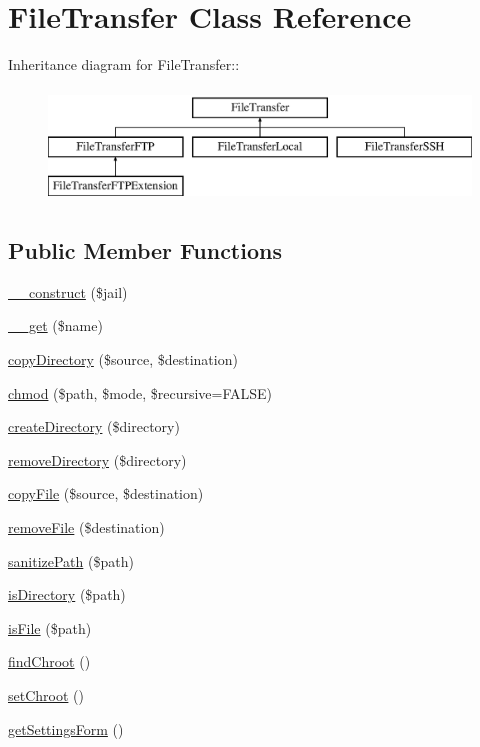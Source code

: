 \hypertarget{classFileTransfer}{
\section{FileTransfer Class Reference}
\label{classFileTransfer}
}
Inheritance diagram for FileTransfer::\begin{figure}[H]
\begin{center}
\leavevmode
\includegraphics[height=3cm]{classFileTransfer}
\end{center}
\end{figure}
\subsection*{Public Member Functions}
\begin{DoxyCompactItemize}
\item 
\hyperlink{classFileTransfer_a179fa76ea4a6f5e3206184cc947a3781}{\_\-\_\-construct} (\$jail)
\item 
\hyperlink{classFileTransfer_a78d103c4fac668da6049bfd4ab713b2f}{\_\-\_\-get} (\$name)
\item 
\hyperlink{classFileTransfer_a85afa98d3b1e04536d298d23bf8c0ceb}{copyDirectory} (\$source, \$destination)
\item 
\hyperlink{classFileTransfer_a7c49554b3cce3ab7cc03e2f45f9934b1}{chmod} (\$path, \$mode, \$recursive=FALSE)
\item 
\hyperlink{classFileTransfer_a8d63f097ba6bf3334420bd8dcccb4898}{createDirectory} (\$directory)
\item 
\hyperlink{classFileTransfer_ace033d9eb68691f41d040cc527b0ea5e}{removeDirectory} (\$directory)
\item 
\hyperlink{classFileTransfer_a8b2a75cd29bb8941663dc51da6a4550c}{copyFile} (\$source, \$destination)
\item 
\hyperlink{classFileTransfer_a3e9fa3033b038b42c8f190da9d6915ab}{removeFile} (\$destination)
\item 
\hyperlink{classFileTransfer_a66b62fbb6a66ffd8f9a986e85aefc98d}{sanitizePath} (\$path)
\item 
\hyperlink{classFileTransfer_a86c4289cfeccacf9bd2bcae8961889ab}{isDirectory} (\$path)
\item 
\hyperlink{classFileTransfer_a0522f0f47d022f2cf8fe375b983d4e39}{isFile} (\$path)
\item 
\hyperlink{classFileTransfer_aafd33ce71a2e77955e172cf6fc204b00}{findChroot} ()
\item 
\hyperlink{classFileTransfer_a09ee9c27162826be5c39d9db3494c1f2}{setChroot} ()
\item 
\hyperlink{classFileTransfer_a3b5e843b16814bdbe43dfecda17bae33}{getSettingsForm} ()
\end{DoxyCompactItemize}
